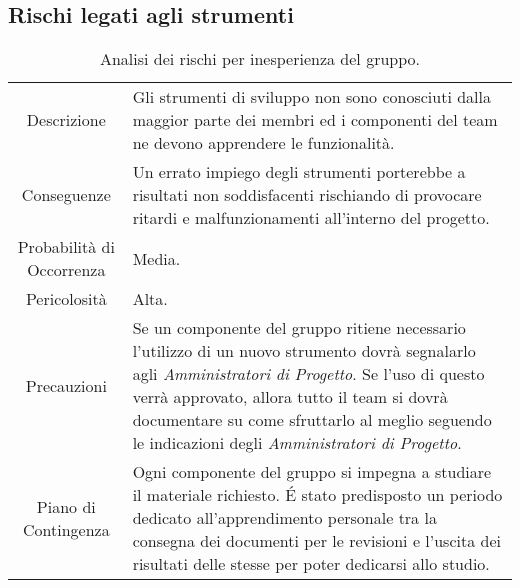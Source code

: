 \subsection{Rischi legati agli strumenti}

\begin{table}[H]
    \begin{tabular}{|c | p{10cm}|}
    \hline
    \rowcolor{darkblue}
    \multicolumn{2}{|c|}{\textcolor{white}{\textbf{RS1 - Inesperienza del Gruppo}}} \\
    \hline
    Descrizione & Gli strumenti di sviluppo non sono conosciuti dalla maggior parte dei membri ed i componenti del team ne devono apprendere le funzionalità.\\ 
    \hline
    Conseguenze & Un errato impiego degli strumenti porterebbe a risultati non soddisfacenti rischiando di provocare ritardi e malfunzionamenti all'interno del progetto.\\
    \hline
    Probabilità di Occorrenza & Media.\\
    \hline
    Pericolosità & Alta.\\
    \hline
    Precauzioni & Se un componente del gruppo ritiene necessario l'utilizzo di un nuovo strumento dovrà segnalarlo agli \textit{Amministratori di Progetto}. Se l'uso di questo verrà approvato, allora tutto il team si dovrà documentare su come sfruttarlo al meglio seguendo le indicazioni degli \textit{Amministratori di Progetto}.\\ 
    \hline
    Piano di Contingenza & Ogni componente del gruppo si impegna a studiare il materiale richiesto. É stato predisposto un periodo dedicato all'apprendimento personale tra la consegna dei documenti per le revisioni e l'uscita dei risultati delle stesse per poter dedicarsi allo studio.\\ 
    \hline
    \end{tabular}
    \caption{\label{tab:RS1}Analisi dei rischi per inesperienza del gruppo.}
    
\end{table}